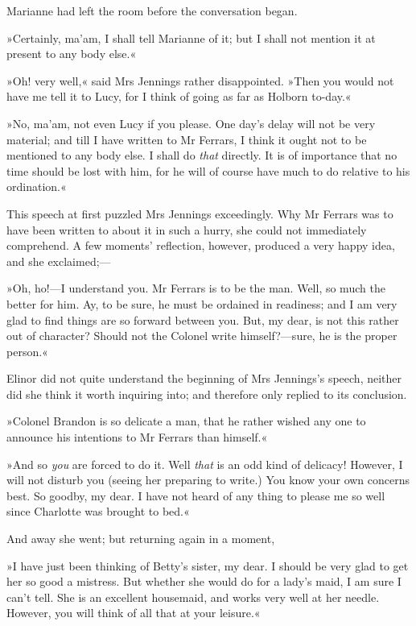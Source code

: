 Marianne had left the room before the conversation began.

»Certainly, ma’am, I shall tell Marianne of it; but I shall not mention it at present to any body else.«

»Oh! very well,« said Mrs Jennings rather disappointed. »Then you would not have me tell it to Lucy, for I think of going as far as Holborn to-day.«

»No, ma’am, not even Lucy if you please. One day’s delay will not be very material; and till I have written to Mr Ferrars, I think it ought not to be mentioned to any body else. I shall do \textit{that} directly. It is of importance that no time should be lost with him, for he will of course have much to do relative to his ordination.«

This speech at first puzzled Mrs Jennings exceedingly. Why Mr Ferrars was to have been written to about it in such a hurry, she could not immediately comprehend. A few moments’ reflection, however, produced a very happy idea, and she exclaimed;—

»Oh, ho!—I understand you. Mr Ferrars is to be the man. Well, so much the better for him. Ay, to be sure, he must be ordained in readiness; and I am very glad to find things are so forward between you. But, my dear, is not this rather out of character? Should not the Colonel write himself?—sure, he is the proper person.«

Elinor did not quite understand the beginning of Mrs Jennings’s speech, neither did she think it worth inquiring into; and therefore only replied to its conclusion.

»Colonel Brandon is so delicate a man, that he rather wished any one to announce his intentions to Mr Ferrars than himself.«

»And so \textit{you} are forced to do it. Well \textit{that} is an odd kind of delicacy! However, I will not disturb you (seeing her preparing to write.) You know your own concerns best. So goodby, my dear. I have not heard of any thing to please me so well since Charlotte was brought to bed.«

And away she went; but returning again in a moment,

»I have just been thinking of Betty’s sister, my dear. I should be very glad to get her so good a mistress. But whether she would do for a lady’s maid, I am sure I can’t tell. She is an excellent housemaid, and works very well at her needle. However, you will think of all that at your leisure.«


